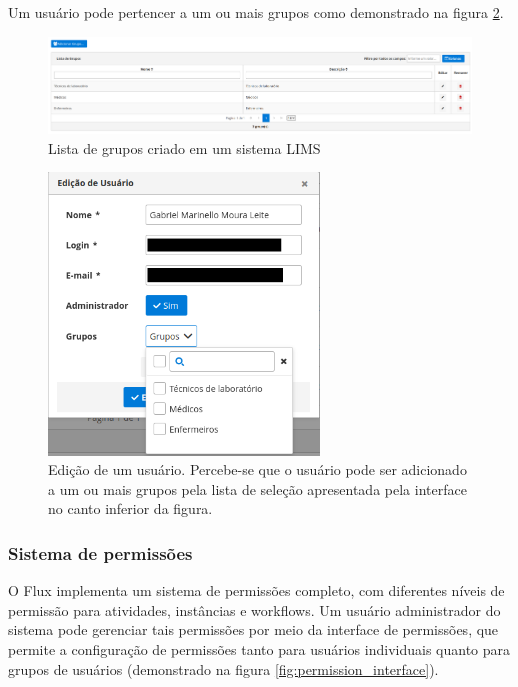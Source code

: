 Um usuário pode pertencer a um ou mais grupos como demonstrado na figura \ref{fig:user_edit}.

\begin{figure}
    \centering
    \includegraphics[width=\textwidth]{imgs/Flux/Grupos/listaDeGrupos.png}
    \caption{Lista de grupos criado em um sistema LIMS}
    \label{fig:groups_list}
\end{figure}

\begin{figure}
    \centering
    \includegraphics[width=\textwidth, height=7.5cm, keepaspectratio]{imgs/Flux/Usuarios/edicaoUsuario.png}
    \caption{Edição de um usuário. Percebe-se que o usuário pode ser adicionado a um ou mais grupos pela lista de seleção apresentada pela interface no canto inferior da figura.}
    \label{fig:user_edit}
\end{figure}

\subsubsection{Sistema de permissões}

O Flux implementa um sistema de permissões completo, com diferentes níveis de permissão para atividades, instâncias e workflows.
Um usuário administrador do sistema pode gerenciar tais permissões por meio da interface de permissões, que permite a configuração de permissões tanto para usuários individuais quanto para grupos de usuários (demonstrado na figura \ref{fig:permission_interface}).

